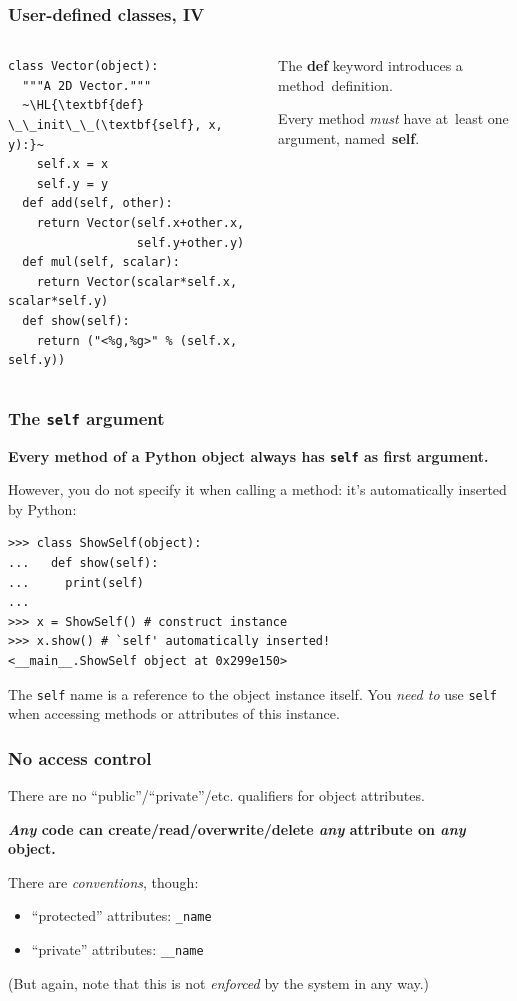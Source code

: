 \documentclass[english,serif,mathserif,xcolor=pdftex,dvipsnames,table]{beamer}
\begin{document}
\begin{frame}[fragile]
  \frametitle{User-defined classes, IV}
  \begin{columns}[t]
    \begin{column}{0.5\textwidth}
\begin{lstlisting}
class Vector(object):
  """A 2D Vector."""
  ~\HL{\textbf{def} \_\_init\_\_(\textbf{self}, x, y):}~
    self.x = x
    self.y = y
  def add(self, other):
    return Vector(self.x+other.x,
                  self.y+other.y)
  def mul(self, scalar):
    return Vector(scalar*self.x, scalar*self.y)
  def show(self):
    return ("<%g,%g>" % (self.x, self.y))
\end{lstlisting}
    \end{column}
    \begin{column}{0.5\textwidth}
      \raggedleft
      The {\bf def} keyword introduces a method~definition.

      \+
      Every method \emph{must} have at~least one argument,
      named~{\bf self}.
    \end{column}
  \end{columns}
\end{frame}


\begin{frame}[fragile]
  \frametitle{The \texttt{self} argument}

  \textbf{Every method of a Python object always has \texttt{self}
    as first argument.}

  \+
  However, you do not specify it when calling a method: it's
  automatically inserted by Python:
\begin{lstlisting}
>>> class ShowSelf(object):
...   def show(self):
...     print(self)
...
>>> x = ShowSelf() # construct instance
>>> x.show() # `self' automatically inserted!
<__main__.ShowSelf object at 0x299e150>
\end{lstlisting}

  \+
  The \texttt{self} name is a reference to the object instance
  itself.  You \emph{need to} use \texttt{self} when accessing methods
  or attributes of this instance.
\end{frame}


\begin{frame}
  \frametitle{No access control}
  There are no ``public''/``private''/etc. qualifiers for object
  attributes.

  \+
  \textbf{\emph{Any} code can create/read/overwrite/delete \emph{any} attribute on
    \emph{any} object.}

  \+
  There are \emph{conventions}, though:
  \begin{itemize}
  \item ``protected'' attributes: \texttt{\_name}
  \item ``private'' attributes: \texttt{\_\_name}
  \end{itemize}
  (But again, note that this is not \emph{enforced} by the system in
  any way.)

\end{frame}
\end{document}
